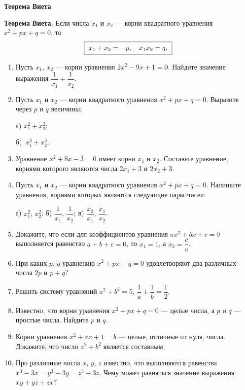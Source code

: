 \documentclass{article}
\begin{document}
\large
	
	
	\begin{center}
		\textbf{Теорема Виета}
	\end{center}

\textbf {Теорема Виета.} Если числа $x_1$ и $x_2$ --- корни квадратного уравнения $x^2 + px + q = 0$, то
$$\boxed{~x_1 + x_2=-p, \quad x_1x_2=q.\strut~}$$

\begin{enumerate}[label*=\protect\fbox{\arabic{enumi}}]
	
\item Пусть $x_1$, $x_2$ --- корни уравнения $2x^2-9x+1=0$. Найдите значение выражения $\dfrac1{x_1}+\dfrac1{x_2}$.

\item  Пусть $x_1$ и $x_2$ --- корни квадратного уравнения $x^2+px+q=0$. Выразите через $p$ и $q$ величины:  

а) $x_1^2+x_2^2$;  

б)~$x_1^3+x_2^3$.

\item Уравнение $x^2+8x-3=0$ имеет корни $x_1$ и $x_2$. Составьте уравнение, корнями которого являются числа $2x_1+3$ и $2x_2+3$.

\item Пусть $x_1$ и $x_2$ --- корни квадратного уравнения $x^2+px+q=0$. Напишите уравнения, корнями которых являются следующие пары чисел:

а) $x_1^2$, $x_2^2$; б) $\dfrac1{x_1}$, $\dfrac1{x_2}$;  в) $\dfrac{x_2}{x_1}$, $\dfrac{x_1}{x_2}$.

\item Докажите, что если для коэффициентов уравнения $ax^2+bx+c=0$ выполняется равенство $a+b+c=0$, то $x_1=1$, а $x_2=\dfrac{c}{a}$.

\item При каких $p$, $q$ уравнению $x^2 + px + q = 0$ удовлетворяют два различных числа $2p$ и $p + q$?

\item Решить систему уравнений $a^2+b^2=5$, $\dfrac1a+\dfrac1b=\dfrac12$.

\item Известно, что корни уравнения  $x^2 + px + q = 0$  --- целые числа, а $p$ и $q$ --- простые числа. Найдите $p$ и $q$.

\item  Корни уравнения $x^2 + ax + 1 = b$ --- целые, отличные от нуля, числа. Докажите, что число
$a^2 + b^2$ является составным.

\item Про различные числа $x$, $y$, $z$ известно, что выполняются равенства $x^3 - 3x = y^3 - 3y = z^3 - 3z$. Чему может равняться значение выражения $xy + yz + zx$?



\end{enumerate}
\end{document}
